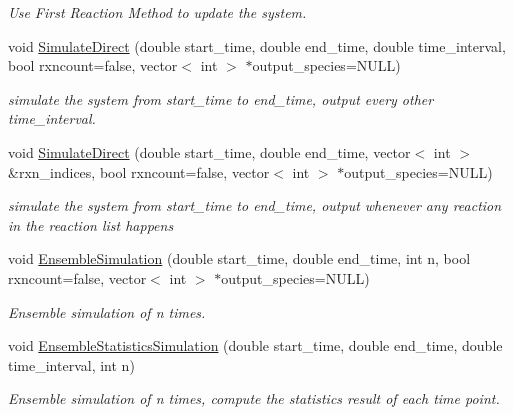 \begin{CompactItemize}
\begin{CompactList}\small\item\em Use First Reaction Method to update the system. \item\end{CompactList}\item 
void \hyperlink{class_s_s_a_b4673a32d5399bc76d96b9616b3a4de7}{SimulateDirect} (double start\_\-time, double end\_\-time, double time\_\-interval, bool rxncount=false, vector$<$ int $>$ $\ast$output\_\-species=NULL)
\begin{CompactList}\small\item\em simulate the system from start\_\-time to end\_\-time, output every other time\_\-interval. \item\end{CompactList}\item 
void \hyperlink{class_s_s_a_39b771ef9ae9962352340c60a7fb7a0d}{SimulateDirect} (double start\_\-time, double end\_\-time, vector$<$ int $>$ \&rxn\_\-indices, bool rxncount=false, vector$<$ int $>$ $\ast$output\_\-species=NULL)
\begin{CompactList}\small\item\em simulate the system from start\_\-time to end\_\-time, output whenever any reaction in the reaction list happens \item\end{CompactList}\item 
void \hyperlink{class_s_s_a_2a56bcd814994728e2e559735a84ed58}{EnsembleSimulation} (double start\_\-time, double end\_\-time, int n, bool rxncount=false, vector$<$ int $>$ $\ast$output\_\-species=NULL)
\begin{CompactList}\small\item\em Ensemble simulation of n times. \item\end{CompactList}\item 
void \hyperlink{class_s_s_a_b682c0d7ecc8542d605f226a164e110e}{EnsembleStatisticsSimulation} (double start\_\-time, double end\_\-time, double time\_\-interval, int n)
\begin{CompactList}\small\item\em Ensemble simulation of n times, compute the statistics result of each time point. \item\end{CompactList}\end{CompactItemize}
